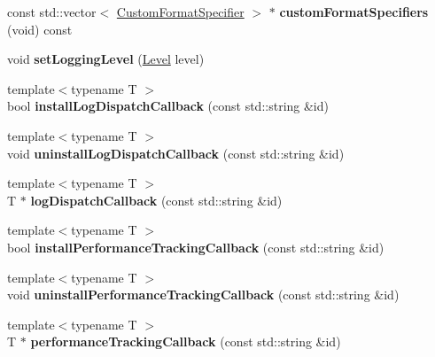\begin{DoxyCompactItemize}
\item 
\hypertarget{a00086_aaafbc69cac920ec79f60e1cf4c2c12d6}{}const std\+::vector$<$ \hyperlink{a00017}{Custom\+Format\+Specifier} $>$ $\ast$ {\bfseries custom\+Format\+Specifiers} (void) const \label{a00086_aaafbc69cac920ec79f60e1cf4c2c12d6}

\item 
\hypertarget{a00086_a163473357c32184769e8edd993c8b440}{}void {\bfseries set\+Logging\+Level} (\hyperlink{a00183_ab0ac6091262344c52dd2d3ad099e8e36}{Level} level)\label{a00086_a163473357c32184769e8edd993c8b440}

\item 
\hypertarget{a00086_aec36c8e770c0ac354e74d57aba1cfa03}{}{\footnotesize template$<$typename T $>$ }\\bool {\bfseries install\+Log\+Dispatch\+Callback} (const std\+::string \&id)\label{a00086_aec36c8e770c0ac354e74d57aba1cfa03}

\item 
\hypertarget{a00086_a34c2c9f8abff647e22e1ee0b52357f88}{}{\footnotesize template$<$typename T $>$ }\\void {\bfseries uninstall\+Log\+Dispatch\+Callback} (const std\+::string \&id)\label{a00086_a34c2c9f8abff647e22e1ee0b52357f88}

\item 
\hypertarget{a00086_a408d2420169a7f7286552fd153967b8d}{}{\footnotesize template$<$typename T $>$ }\\T $\ast$ {\bfseries log\+Dispatch\+Callback} (const std\+::string \&id)\label{a00086_a408d2420169a7f7286552fd153967b8d}

\item 
\hypertarget{a00086_ad95b77123066f0a49817155dd75583b5}{}{\footnotesize template$<$typename T $>$ }\\bool {\bfseries install\+Performance\+Tracking\+Callback} (const std\+::string \&id)\label{a00086_ad95b77123066f0a49817155dd75583b5}

\item 
\hypertarget{a00086_a0e69baf4bf3140fb7bc88bb386d933cf}{}{\footnotesize template$<$typename T $>$ }\\void {\bfseries uninstall\+Performance\+Tracking\+Callback} (const std\+::string \&id)\label{a00086_a0e69baf4bf3140fb7bc88bb386d933cf}

\item 
\hypertarget{a00086_aa511779589370416030d9fc1149a32fd}{}{\footnotesize template$<$typename T $>$ }\\T $\ast$ {\bfseries performance\+Tracking\+Callback} (const std\+::string \&id)\label{a00086_aa511779589370416030d9fc1149a32fd}

\end{DoxyCompactItemize}
